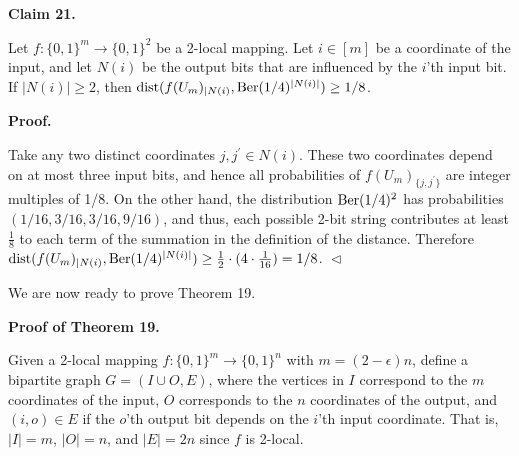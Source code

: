 \par\medskip\noindent\textbf{
Claim 21. 
}\par



Let $f\colon\{0,1\}^{m}\to\{0,1\}^{2}$ be a 2-local mapping. Let $i\in[m]$ be a coordinate of the input, and let $N(i)$ be the output bits that are influenced by the $i$’th input bit.
If $\lvert N(i)\rvert\geq 2$, then $\mathrm{dist}(f(U_{m})_{|N(i)},\textnormal{Ber}(1/4)^{\lvert N(i)\rvert})\geq 1/8$.\par







\par\medskip\noindent\textbf{
\textbf{Proof}.}\par




Take any two distinct coordinates $j,j^{\prime}\in N(i)$. These two coordinates depend on at most three input bits, and hence all probabilities of $f(U_{m})_{\{j,j^{\prime}\}}$ are integer multiples of 1/8.
On the other hand, the distribution $\textnormal{Ber}(1/4)^{2}$ has probabilities $(1/16,3/16,3/16,9/16)$, and thus, each possible 2-bit string contributes at least $\frac{1}{8}$ to each term of the summation in the definition of the distance. Therefore
$\mathrm{dist}(f(U_{m})_{|N(i)},\textnormal{Ber}(1/4)^{\lvert N(i)\rvert})\geq\frac{1}{2}\cdot(4\cdot\frac{1}{16})=1/8$.
$\vartriangleleft$\par




We are now ready to prove Theorem 19.\par





\par\medskip\noindent\textbf{Proof of Theorem 19.}\par




Given a 2-local mapping $f\colon\{0,1\}^{m}\to\{0,1\}^{n}$ with $m=(2-\epsilon)n$, define a bipartite graph $G=(I\cup O,E)$, where the vertices in $I$ correspond to the $m$ coordinates of the input, $O$ corresponds to the $n$ coordinates of the output, and $(i,o)\in E$ if the $o$’th output bit depends on the $i$’th input coordinate. That is, $\lvert I\rvert=m$, $\lvert O\rvert=n$, and $\lvert E\rvert=2n$ since $f$ is 2-local.\par




